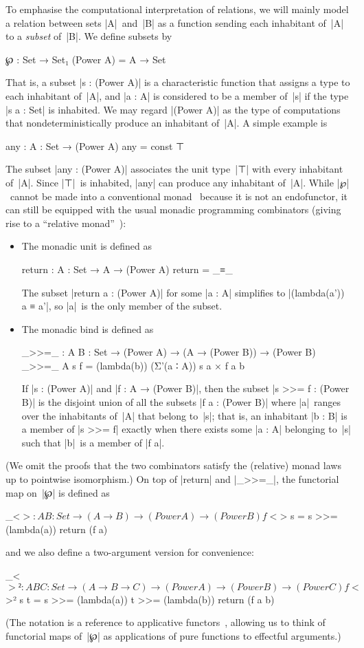 To emphasise the computational interpretation of relations, we will mainly model a relation between sets |A|~and~|B| as a function sending each inhabitant of~|A| to a \emph{subset} of~|B|.
We define subsets by
\begin{code}
℘ : Set → Set₁
(Power A) = A → Set
\end{code}
That is, a subset |s : (Power A)| is a characteristic function that assigns a type to each inhabitant of~|A|, and |a : A| is considered to be a member of~|s| if the type |s a : Set| is inhabited.
We may regard |(Power A)| as the type of computations that nondeterministically produce an inhabitant of~|A|.
A simple example is
\begin{code}
any : {A : Set} → (Power A)
any = const ⊤
\end{code}
The subset |any : (Power A)| associates the unit type~|⊤| with every inhabitant of~|A|.
Since |⊤|~is inhabited, |any| can produce any inhabitant of~|A|.
While |℘|~cannot be made into a conventional monad~\citep{Moggi-monads, Wadler-essence} because it is not an endofunctor, it can still be equipped with the usual monadic programming combinators (giving rise to a ``relative monad''~\citep{Altenkirch-relative-monads}):
\begin{itemize}
\item The monadic unit is defined as
\begin{code}
return : {A : Set} → A → (Power A)
return = _≡_
\end{code}
The subset |return a : (Power A)| for some |a : A| simplifies to |(lambda(a')) a ≡ a'|, so |a|~is the only member of the subset.
\item The monadic bind is defined as
\begin{code}
_>>=_ : {A B : Set} → (Power A) → (A → (Power B)) → (Power B)
_>>=_ {A} s f = (lambda(b)) (Σ'(a ∶ A)) s a × f a b
\end{code}
If |s : (Power A)| and |f : A → (Power B)|, then the subset |s >>= f : (Power B)| is the disjoint union of all the subsets |f a : (Power B)| where |a|~ranges over the inhabitants of~|A| that belong to~|s|; that is, an inhabitant |b : B| is a member of |s >>= f| exactly when there exists some |a : A| belonging to~|s| such that |b|~is a member of |f a|.
\end{itemize}
(We omit the proofs that the two combinators satisfy the (relative) monad laws up to pointwise isomorphism.)
On top of |return| and |_>>=_|\kern1pt, the functorial map on~|℘| is defined as
\begin{code}
_<$> : {A B : Set} → (A → B) → (Power A) → (Power B)
f <$> s = s >>= (lambda(a)) return (f a)
\end{code}
and we also define a two-argument version for convenience:
\begin{code}
_<$>² : {A B C : Set} → (A → B → C) → (Power A) → (Power B) → (Power C)
f <$>² s t = s >>= (lambda(a)) t >>= (lambda(b)) return (f a b)
\end{code}
(The notation is a reference to applicative functors~\citep{McBride-Applicative}, allowing us to think of functorial maps of~|℘| as applications of pure functions to effectful arguments.)


